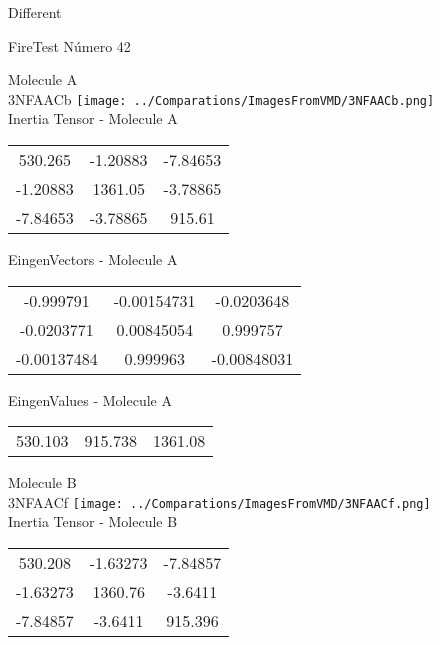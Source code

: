 \begin{center}
\vtab
\vtab
\textcolor{NavyBlue}{\Large Different}
\end{center}

 \newpage

\vtab[-2cm]
\begin{center}
{\large FireTest \tab Número 42}
\end{center}
\begin{multicols}{2}
\begin{center}

Molecule A \\ 
3NFAACb
\texttt{[image: ../Comparations/ImagesFromVMD/3NFAACb.png]}
\\
Inertia Tensor - Molecule A \\
\vtab

\begin{tabular}{|c c c|}
530.265	 & 	-1.20883	 & 	-7.84653	 \\
-1.20883	 & 	1361.05	 & 	-3.78865	 \\
-7.84653	 & 	-3.78865	 & 	915.61
\end{tabular}

\vtab
 EingenVectors - Molecule A     \\
\vtab
\begin{tabular}{|c c c|}
-0.999791	 & 	-0.00154731	 & 	-0.0203648	 \\
-0.0203771	 & 	0.00845054	 & 	0.999757	 \\
-0.00137484	 & 	0.999963	 & 	-0.00848031
\end{tabular}

\vtab
 EingenValues - Molecule A     \\
\vtab
\begin{tabular}{|c c c|}
530.103	 & 	915.738	 & 	1361.08	 \\
\end{tabular}
\columnbreak

Molecule B \\ 
3NFAACf
\texttt{[image: ../Comparations/ImagesFromVMD/3NFAACf.png]}
\\
Inertia Tensor - Molecule B \\
\vtab

\begin{tabular}{|c c c|}
530.208	 & 	-1.63273	 & 	-7.84857	 \\
-1.63273	 & 	1360.76	 & 	-3.6411	 \\
-7.84857	 & 	-3.6411	 & 	915.396
\end{tabular}


\end{center}
\end{multicols}

